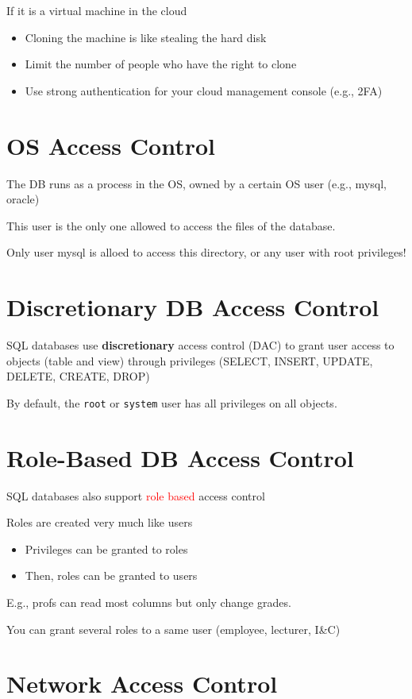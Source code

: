 \documentclass[11pt]{article}
\begin{document}
If it is a virtual machine in the cloud
\begin{itemize}
	\item Cloning the machine is like stealing the hard disk
	\item Limit the number of people who have the right to clone
	\item Use strong authentication for your cloud management console (e.g., 2FA)
\end{itemize}

\section*{OS Access Control}
The DB runs as a process in the OS, owned by a certain OS user (e.g., mysql, oracle)

This user is the only one allowed to access the files of the database. 

Only user mysql is alloed to access this directory, or any user with root privileges!

\section*{Discretionary DB Access Control}

SQL databases use \textbf{discretionary} access control (DAC) to grant user access to objects (table and view) through privileges (SELECT, INSERT, UPDATE, DELETE, CREATE, DROP)

By default, the \verb|root| or \verb|system| user has all privileges on all objects.

\section*{Role-Based DB Access Control}

SQL databases also support \textcolor{red}{role based} access control

Roles are created very much like users
\begin{itemize}
	\item Privileges can be granted to roles
	\item Then, roles can be granted to users
\end{itemize}

E.g., profs can read most columns but only change grades.

You can grant several roles to a same user (employee, lecturer, I\&C)

\section*{Network Access Control}
\end{document}
